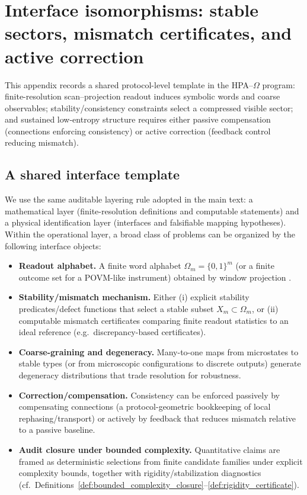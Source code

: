 \section{Interface isomorphisms: stable sectors, mismatch certificates, and active correction}
\label{app:isomorphism_dictionary}

This appendix records a shared protocol-level template in the HPA--$\Omega$ program: finite-resolution scan--projection readout induces symbolic words and coarse observables; stability/consistency constraints select a compressed visible sector; and sustained low-entropy structure requires either passive compensation (connections enforcing consistency) or active correction (feedback control reducing mismatch).

\subsection{A shared interface template}
We use the same auditable layering rule adopted in the main text: a mathematical layer (finite-resolution definitions and computable statements) and a physical identification layer (interfaces and falsifiable mapping hypotheses).
Within the operational layer, a broad class of problems can be organized by the following interface objects:
\begin{itemize}
  \item \textbf{Readout alphabet.} A finite word alphabet $\Omega_m=\{0,1\}^m$ (or a finite outcome set for a POVM-like instrument) obtained by window projection \cite{NielsenChuang2010}.
  \item \textbf{Stability/mismatch mechanism.} Either (i) explicit stability predicates/defect functions that select a stable subset $X_m\subset\Omega_m$, or (ii) computable mismatch certificates comparing finite readout statistics to an ideal reference (e.g.\ discrepancy-based certificates).
  \item \textbf{Coarse-graining and degeneracy.} Many-to-one maps from microstates to stable types (or from microscopic configurations to discrete outputs) generate degeneracy distributions that trade resolution for robustness.
  \item \textbf{Correction/compensation.} Consistency can be enforced passively by compensating connections (a protocol-geometric bookkeeping of local rephasing/transport) or actively by feedback that reduces mismatch relative to a passive baseline.
  \item \textbf{Audit closure under bounded complexity.} Quantitative claims are framed as deterministic selections from finite candidate families under explicit complexity bounds, together with rigidity/stabilization diagnostics (cf.\ Definitions~\ref{def:bounded_complexity_closure}--\ref{def:rigidity_certificate}).
\end{itemize}

